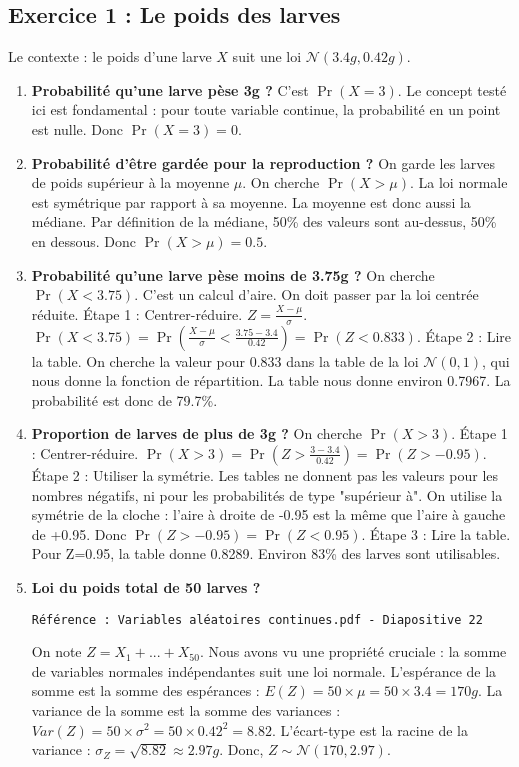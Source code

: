 \documentclass[12pt, a4paper]{article}
\newcommand{\slidenote}[1]{%
    \par\vspace{1.5ex}%
    \noindent\texttt{\small\color{gray}#1}\par\nopagebreak\vspace{1.5ex}%
}
\begin{document}
\subsection*{Exercice 1 : Le poids des larves}
Le contexte : le poids d'une larve $X$ suit une loi $\mathcal{N}(3.4g, 0.42g)$.

\begin{enumerate}
    \item \textbf{Probabilité qu'une larve pèse 3g ?}
    C'est $\Pr(X=3)$. Le concept testé ici est fondamental : pour toute variable continue, la probabilité en un point est nulle. Donc $\Pr(X=3)=0$.

    \item \textbf{Probabilité d'être gardée pour la reproduction ?}
    On garde les larves de poids supérieur à la moyenne $\mu$. On cherche $\Pr(X > \mu)$. La loi normale est symétrique par rapport à sa moyenne. La moyenne est donc aussi la médiane. Par définition de la médiane, 50\% des valeurs sont au-dessus, 50\% en dessous. Donc $\Pr(X > \mu) = 0.5$.

    \item \textbf{Probabilité qu'une larve pèse moins de 3.75g ?}
    On cherche $\Pr(X < 3.75)$. C'est un calcul d'aire. On doit passer par la loi centrée réduite.
    Étape 1 : Centrer-réduire. $Z = \frac{X-\mu}{\sigma}$.
    $\Pr(X < 3.75) = \Pr\left(\frac{X-\mu}{\sigma} < \frac{3.75 - 3.4}{0.42}\right) = \Pr(Z < 0.833)$.
    Étape 2 : Lire la table. On cherche la valeur pour 0.833 dans la table de la loi $\mathcal{N}(0,1)$, qui nous donne la fonction de répartition. La table nous donne environ 0.7967. La probabilité est donc de 79.7\%.

    \item \textbf{Proportion de larves de plus de 3g ?}
    On cherche $\Pr(X > 3)$.
    Étape 1 : Centrer-réduire. $\Pr(X > 3) = \Pr\left(Z > \frac{3 - 3.4}{0.42}\right) = \Pr(Z > -0.95)$.
    Étape 2 : Utiliser la symétrie. Les tables ne donnent pas les valeurs pour les nombres négatifs, ni pour les probabilités de type "supérieur à". On utilise la symétrie de la cloche : l'aire à droite de -0.95 est la même que l'aire à gauche de +0.95.
    Donc $\Pr(Z > -0.95) = \Pr(Z < 0.95)$.
    Étape 3 : Lire la table. Pour Z=0.95, la table donne 0.8289. Environ 83\% des larves sont utilisables.

    \item \textbf{Loi du poids total de 50 larves ?}
    \slidenote{Référence : Variables aléatoires continues.pdf - Diapositive 22}
    On note $Z = X_1 + ... + X_{50}$. Nous avons vu une propriété cruciale : la somme de variables normales indépendantes suit une loi normale.
    L'espérance de la somme est la somme des espérances : $E(Z) = 50 \times \mu = 50 \times 3.4 = 170g$.
    La variance de la somme est la somme des variances : $Var(Z) = 50 \times \sigma^2 = 50 \times 0.42^2 = 8.82$.
    L'écart-type est la racine de la variance : $\sigma_Z = \sqrt{8.82} \approx 2.97g$.
    Donc, $Z \sim \mathcal{N}(170, 2.97)$.
\end{enumerate}
\end{document}
